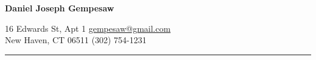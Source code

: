 \newcommand{\myauthor}[1] {
  \begin{center}
    \Large
    \textbf{#1}
  \end{center}
  \normalsize}
%
\newcommand{\contact}[4] {
  #1 \hfill \href{mailto:#3}{#3}\\
  #2 \hfill #4\\
  \hrule
}
%
\myauthor{Daniel Joseph Gempesaw}
\contact{16 Edwards St, Apt 1}
        {New Haven, CT 06511}
        {gempesaw@gmail.com}
        {(302) 754-1231}
